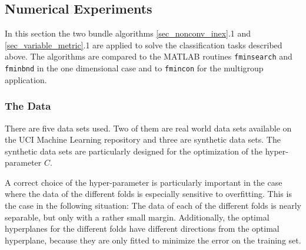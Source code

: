 



\subsection{Numerical Experiments}

In this section the two bundle algorithms \ref{sec_nonconv_inex}.1 and \ref{sec_variable_metric}.1 are applied to solve the classification tasks described above.
The algorithms are compared to the MATLAB routines \texttt{fminsearch} and \texttt{fminbnd} in the one dimensional case and to \texttt{fmincon} for the multigroup application.


\subsubsection{The Data}
There are five data sets used. Two of them are real world data sets available on the UCI Machine Learning repository \cite{Lichman2013} and three are synthetic data sets.
The synthetic data sets are particularly designed for the optimization of the hyper-parameter \(C\).

A correct choice of the hyper-parameter is particularly important in the case where the data of the different folds is especially sensitive to overfitting.
This is the case in the following situation: The data of each of the different folds is nearly separable, but only with a rather small margin. Additionally, the optimal hyperplanes for the different folds have different directions from the optimal hyperplane, because they are only fitted to minimize the error on the training set.

